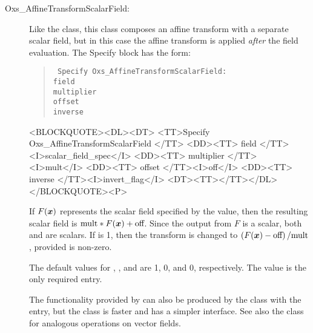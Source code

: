 \begin{description}
\item[Oxs\_AffineTransformScalarField:\label{item:AffineTransformScalarField}]
%
Like the  class, this class composes
an affine transform with a separate scalar field, but in this case the
affine transform is applied \textit{after} the field evaluation.
The Specify block has the form:
\begin{latexonly}
\begin{quote}\tt
Specify Oxs\_AffineTransformScalarField: \ocb\\
 \bi field \\
 \bi multiplier \\
 \bi offset \\
 \bi inverse \\
\ccb
\end{quote}
\end{latexonly}
\begin{rawhtml}
<BLOCKQUOTE><DL><DT>
<TT>Specify Oxs_AffineTransformScalarField {</TT>
<DD><TT> field </TT><I>scalar_field_spec</I>
<DD><TT> multiplier </TT><I>mult</I>
<DD><TT> offset </TT><I>off</I>
<DD><TT> inverse </TT><I>invert_flag</I>
<DT><TT>}</TT></DL></BLOCKQUOTE><P>
\end{rawhtml}
If $F(\mbox{\boldmath$x$})$ represents the scalar field specified by the
 value, then the resulting scalar field is
$\textrm{mult}*F(\mbox{\boldmath$x$})+\textrm{off}$.  Since the output
from $F$ is a scalar, both  and 
are scalars.  If  is 1, then the transform is changed
to $\left(F(\mbox{\boldmath$x$})-\textrm{off}\right)/\textrm{mult}$,
provided  is non-zero.

The default values for , , and
 are 1, 0, and 0, respectively.  The 
value is the only required entry.

The functionality provided by  can
also be produced by the
class with the
 entry, but the 
class is faster and has a simpler interface.  See also the
class for analogous
operations on vector fields.


\end{description}
